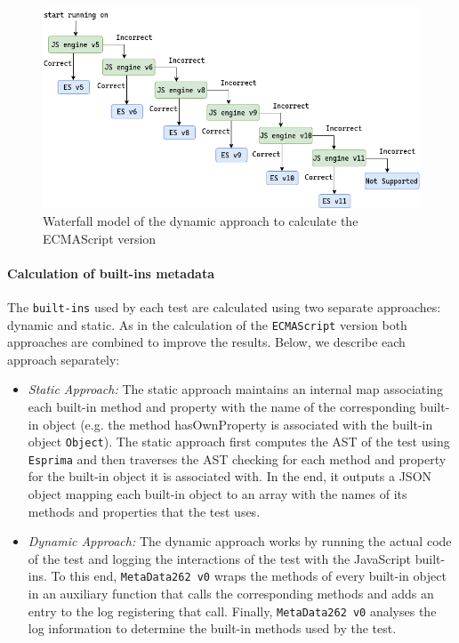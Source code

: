 \documentclass[runningheads]{llncs}
\begin{document}
\begin{figure}[ht]
    \centering
    \includegraphics[width=1\textwidth]{images/waterfall_model.png}
    \caption{Waterfall model of the dynamic approach to calculate the ECMAScript version}
    \label{fig:waterfall_model}
\end{figure}



\paragraph{Calculation of built-ins metadata}
The \texttt{built-ins} used by each test are calculated using two separate approaches: dynamic and static. As in the calculation of the \texttt{ECMAScript} version both approaches are combined to improve the results. Below, we describe each approach separately:

\begin{itemize}
  \item \emph{Static Approach:}
The static approach maintains an internal map associating each built-in method and property with the name of the corresponding  built-in object (e.g. the method hasOwnProperty is associated with the built-in object \texttt{Object}). The static approach first computes the AST of the test using \texttt{Esprima} and then traverses the AST checking for each method and property for the built-in object it is associated with. In the end, it outputs a JSON object mapping each built-in object to an array with the names of its methods and properties that the test uses.
%
  \item \emph{Dynamic Approach:}
The dynamic approach works by running the actual code of the test and logging the interactions of the test with the JavaScript built-ins. To this end, \texttt{MetaData262 v0} wraps the methods of every built-in object in an auxiliary function that calls the corresponding methods and adds an entry to the log registering that call. Finally, \texttt{MetaData262 v0} analyses the log information to determine the built-in methods used by the test.
\end{itemize}
\end{document}
